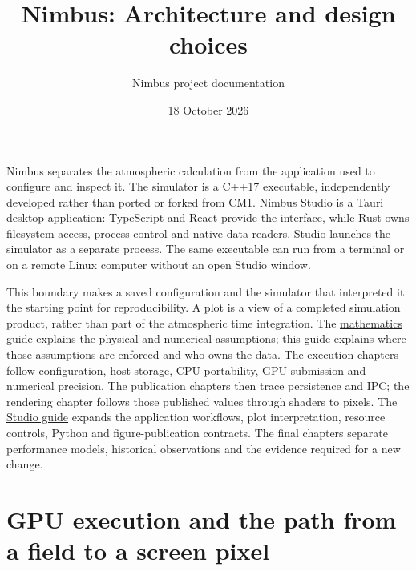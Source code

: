 \documentclass[
  11pt,
]{article}
\title{Nimbus: Architecture and design choices}
\author{Nimbus project documentation}
\date{18 October 2026}
\begin{document}
\hypersetup{pageanchor=false}
\maketitle
\hypersetup{pageanchor=true}

{
\small
\setlength{\parskip}{0pt}
\setcounter{tocdepth}{2}
\tableofcontents
}
\clearpage
{}
\pagestyle{fancy}
Nimbus separates the atmospheric calculation from the application used
to configure and inspect it. The simulator is a C++17 executable, independently
developed rather than ported or forked from CM1. Nimbus Studio is a Tauri
desktop application: TypeScript and React provide the
interface, while Rust owns filesystem access, process control and native
data readers. Studio launches the simulator as a separate process. The
same executable can run from a terminal or on a remote Linux computer
without an open Studio window.

This boundary makes a saved configuration and the simulator that
interpreted it the starting point for reproducibility. A plot is a view
of a completed simulation product, rather than part of the atmospheric
time integration. The \href{MATHEMATICS.pdf}{mathematics guide} explains the
physical and numerical assumptions; this guide explains where those
assumptions are enforced and who owns the data. The execution chapters follow
configuration, host storage, CPU portability, GPU submission and numerical
precision. The publication chapters then trace persistence and IPC; the
rendering chapter follows those published values through shaders to pixels.
The \href{STUDIO.pdf}{Studio guide} expands the application workflows, plot
interpretation, resource controls, Python and figure-publication contracts.
The final chapters separate performance models, historical observations and
the evidence required for a new change.











\section{GPU execution and the path from a field to a screen
pixel}\label{gpu-execution-and-the-path-from-a-field-to-a-screen-pixel}
\end{document}
